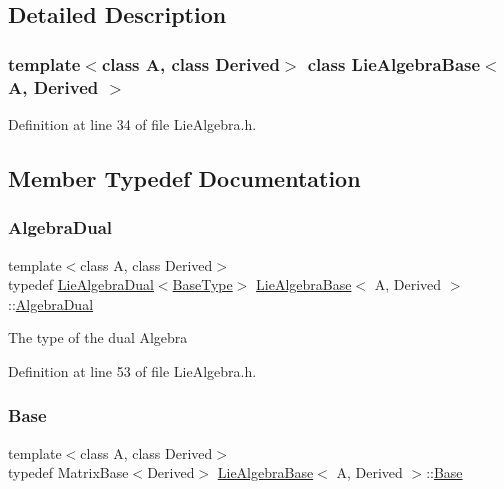 \subsection{Detailed Description}
\subsubsection*{template$<$class A, class Derived$>$\newline
class Lie\+Algebra\+Base$<$ A, Derived $>$}



Definition at line 34 of file Lie\+Algebra.\+h.



\subsection{Member Typedef Documentation}
\hypertarget{class_lie_algebra_base_a295c784d24a14e39763f3ff5c2abd155}{}\label{class_lie_algebra_base_a295c784d24a14e39763f3ff5c2abd155} 
\subsubsection{\texorpdfstring{Algebra\+Dual}{AlgebraDual}}
{\footnotesize\ttfamily template$<$class A, class Derived$>$ \\
typedef \hyperlink{class_lie_algebra_dual}{Lie\+Algebra\+Dual}$<$\hyperlink{class_lie_algebra_base_ae7884e2973ffa35f8b209b2831a066a1}{Base\+Type}$>$ \hyperlink{class_lie_algebra_base}{Lie\+Algebra\+Base}$<$ A, Derived $>$\+::\hyperlink{class_lie_algebra_base_a295c784d24a14e39763f3ff5c2abd155}{Algebra\+Dual}}

The type of the dual Algebra 

Definition at line 53 of file Lie\+Algebra.\+h.

\hypertarget{class_lie_algebra_base_aa2d976fdcf8653f8a5a3f414e725a3e9}{}\label{class_lie_algebra_base_aa2d976fdcf8653f8a5a3f414e725a3e9} 
\subsubsection{\texorpdfstring{Base}{Base}}
{\footnotesize\ttfamily template$<$class A, class Derived$>$ \\
typedef Matrix\+Base$<$Derived$>$ \hyperlink{class_lie_algebra_base}{Lie\+Algebra\+Base}$<$ A, Derived $>$\+::\hyperlink{class_lie_algebra_base_aa2d976fdcf8653f8a5a3f414e725a3e9}{Base}\hspace{0.3cm}{\ttfamily [protected]}}


